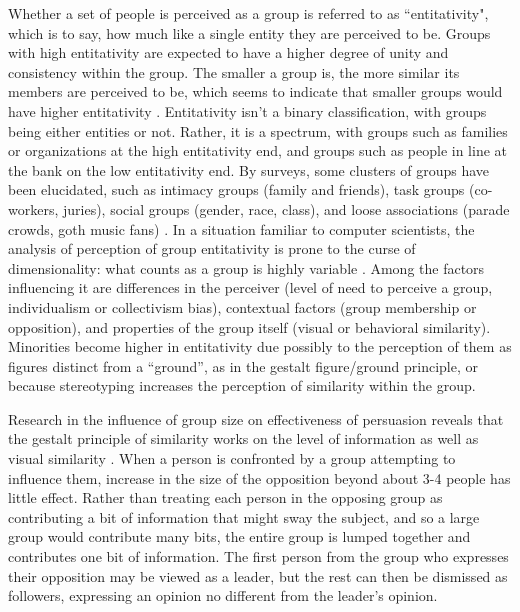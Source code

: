 Whether a set of people is perceived as a group is referred to as ``entitativity", which is to say, how much like a single entity they are perceived to be. 
Groups with high entitativity are expected to have a higher degree of unity and consistency within the group. 
The smaller a group is, the more similar its members are perceived to be, which seems to indicate that smaller groups would have higher entitativity \citep{stewart2003trust}. 
Entitativity isn't a binary classification, with groups being either entities or not. 
Rather, it is a spectrum, with groups such as families or organizations at the high entitativity end, and groups such as people in line at the bank on the low entitativity end. 
By surveys, some clusters of groups have been elucidated, such as intimacy groups (family and friends), task groups (co-workers, juries), social groups (gender, race, class), and loose associations (parade crowds, goth music fans) \citep{lickel2001elements}. 
In a situation familiar to computer scientists, the analysis of perception of group entitativity is prone to the curse of dimensionality: what counts as a group is highly variable \citep{lickel2000varieties}.  
Among the factors influencing it are differences in the perceiver (level of need to perceive a group, individualism or collectivism bias), contextual factors (group membership or opposition), and properties of the group itself (visual or behavioral similarity).
Minorities become higher in entitativity due possibly to the perception of them as figures distinct from a ``ground'', as in the gestalt figure/ground principle, or because stereotyping increases the perception of similarity within the group. 
	
Research in the influence of group size on effectiveness of persuasion reveals that the gestalt principle of similarity works on the level of information as well as visual similarity \cite{wilder1977perception}. 
When a person is confronted by a group attempting to influence them, increase in the size of the opposition beyond about 3-4 people has little effect. 
Rather than treating each person in the opposing group as contributing a bit of information that might sway the subject, and so a large group would contribute many bits, the entire group is lumped together and contributes one bit of information. 
The first person from the group who expresses their opposition may be viewed as a leader, but the rest can then be dismissed as followers, expressing an opinion no different from the leader's opinion. 

